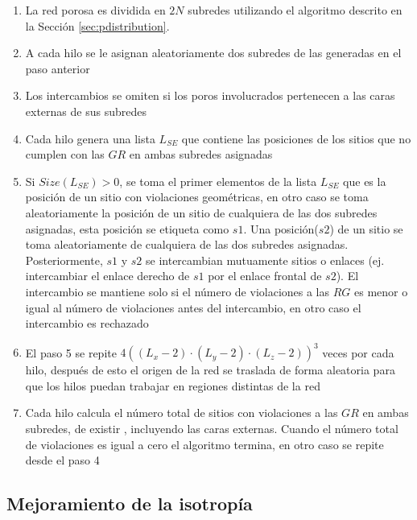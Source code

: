 \begin{enumerate}
\item La red porosa es dividida en $2N$ subredes utilizando el algoritmo descrito en la Sección \ref{sec:pdistribution}.

\item A cada hilo se le asignan aleatoriamente dos subredes de las generadas en el paso anterior

\item Los intercambios se omiten si los poros involucrados pertenecen a las caras  externas de sus subredes

\item Cada hilo genera una lista $L_{SE}$ que contiene las posiciones de los sitios que no cumplen con las $GR$ en ambas subredes asignadas 

\item Si $Size(L_{SE}) > 0$, se toma el primer elementos de la lista $L_{SE}$ que es la posición de un sitio con violaciones geométricas, en otro caso se toma aleatoriamente la posición de un sitio de cualquiera de las dos subredes asignadas, esta posición se etiqueta como $s1$. Una posición($s2$) de un sitio se toma aleatoriamente de cualquiera de las dos subredes asignadas. Posteriormente, $s1$ y $s2$ se intercambian mutuamente sitios o enlaces (ej. intercambiar el enlace derecho de $s1$ por el enlace frontal de $s2$). El intercambio se mantiene solo si el número de violaciones a las $RG$ es menor o igual al número de violaciones antes del intercambio, en otro caso el intercambio es rechazado

\item El paso 5 se repite $4(( L_x  - 2) \cdot (L_y - 2) \cdot (L_z - 2))^3$ veces por cada hilo, después de esto el origen de la red se traslada de forma aleatoria para que los hilos puedan trabajar en regiones distintas de la red

\item Cada hilo calcula el número total de sitios con violaciones a las $GR$ en ambas subredes, de existir , incluyendo las caras externas. Cuando el número total de violaciones es igual a cero el algoritmo termina, en otro caso se repite desde el paso 4
\end{enumerate}

\subsection{Mejoramiento de la isotropía}
\label{subsec:pisotropy}
